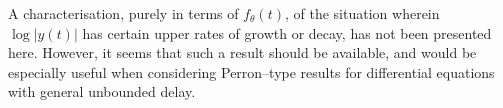 \documentclass[a4paper,10pt,reqno]{amsart}
\numberwithin{equation}{section}
\newtheorem{theorem}{Theorem}
\theoremstyle{definition}
\theoremstyle{remark}
\DeclareMathOperator{\1}{\mathbbm 1}
\begin{document}
A characterisation, purely in terms of $f_\theta(t)$, of the situation wherein $\log |y(t)|$ has certain upper rates of growth or decay, has not been presented here. However, it seems that such a result should be available, and would be especially useful when considering Perron--type results for differential equations with general unbounded delay.  

%
%	
%	
\end{document}
